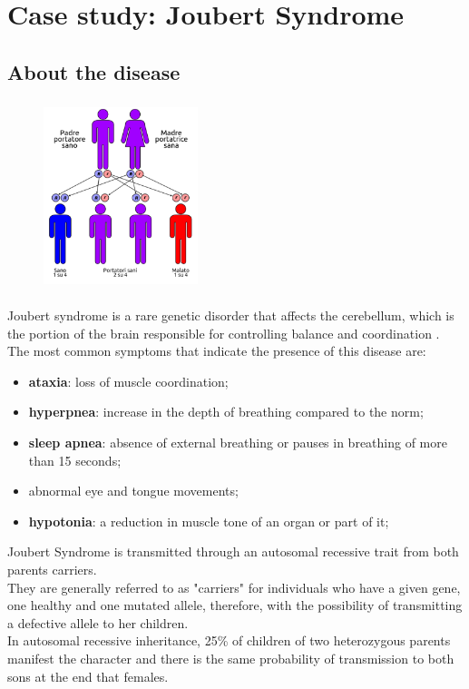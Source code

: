 \documentclass[a4paper]{report}
\begin{document}
\chapter{Case study: Joubert Syndrome}
\section{About the disease}
\begin{figure}[b]
\centering
\includegraphics[height=5.5cm, width=4.5cm]{figuraJoubert.jpg}
\end{figure}
Joubert syndrome is a rare genetic disorder that affects the cerebellum, which is the portion of the brain responsible for controlling balance and coordination \cite{1}.
The most common symptoms that indicate the presence of this disease are:
\begin{itemize}
    \item \textbf{ataxia}: loss of muscle coordination;
    \item \textbf{hyperpnea}: increase in the depth of breathing compared to the norm;
    \item \textbf{sleep apnea}: absence of external breathing or pauses in breathing of more than 15 seconds;
    \item abnormal eye and tongue movements;
    \item \textbf{hypotonia}: a reduction in muscle tone of an organ or part of it;
\end{itemize}
Joubert Syndrome is transmitted through an autosomal recessive trait from both parents carriers.\\
 They are generally referred to as "carriers" for individuals who have a given gene, one healthy and one mutated allele, therefore, with the possibility of transmitting a defective allele to her children. \\
In autosomal recessive inheritance, 25\% of children of two heterozygous parents manifest the character and there is the same probability of transmission to both sons at the end that females. \\
\end{document}
